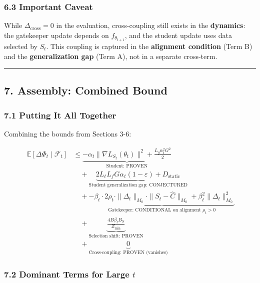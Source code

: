 \documentclass[
  12pt,
]{article}
\begin{document}
\subsubsection{6.3 Important Caveat}\label{important-caveat}

While \(\Delta_{\text{cross}} = 0\) in the evaluation, cross-coupling
still exists in the \textbf{dynamics}: the gatekeeper update depends on
\(f_{\theta_{t+1}}\), and the student update uses data selected by
\(S_t\). This coupling is captured in the \textbf{alignment condition}
(Term B) and the \textbf{generalization gap} (Term A), not in a separate
cross-term.

\begin{center}\rule{0.5\linewidth}{0.5pt}\end{center}

\subsection{7. Assembly: Combined Bound}\label{assembly-combined-bound}

\subsubsection{7.1 Putting It All
Together}\label{putting-it-all-together}

Combining the bounds from Sections 3-6:

\[\boxed{\;\begin{aligned}
\mathbb{E}[\Delta\Phi_t \mid \mathcal{F}_t] &\leq \underbrace{-\alpha_t \|\nabla L_{S_t}(\theta_t)\|^2 + \frac{L_g \alpha_t^2 G^2}{2}}_{\text{Student: PROVEN}} \\
&\quad + \underbrace{2 L_\ell L_f G \alpha_t (1-\varepsilon) + D_{\text{static}}}_{\text{Student generalization gap: CONJECTURED}} \\
&\quad + \underbrace{-\beta_t \cdot 2\rho_t \cdot \|\Delta_t\|_{M_0} \cdot \|S_t - \hat{C}\|_{M_0} + \beta_t^2 \|\Delta_t\|_{M_0}^2}_{\text{Gatekeeper: CONDITIONAL on alignment } \rho_t > 0} \\
&\quad + \underbrace{\frac{4B \beta_t B_S}{Z_{\min}}}_{\text{Selection shift: PROVEN}} \\
&\quad + \underbrace{0}_{\text{Cross-coupling: PROVEN (vanishes)}}
\end{aligned}}\]

\subsubsection{\texorpdfstring{7.2 Dominant Terms for Large
\(t\)}{7.2 Dominant Terms for Large t}}\label{dominant-terms-for-large-t}
\end{document}
